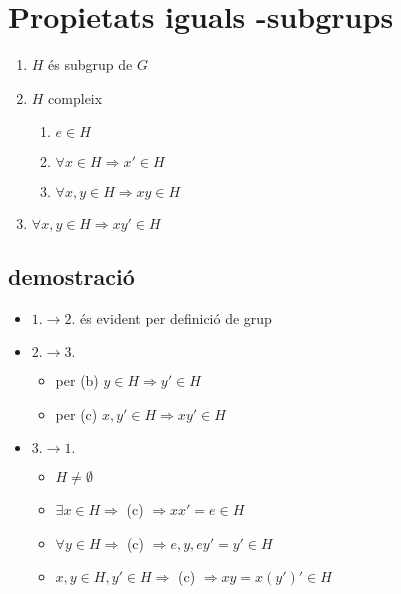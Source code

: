 \documentclass{article}
\begin{document}
\section{Propietats iguals -subgrups}
\begin{enumerate}
\item $H$ és subgrup de $G$
\item $H$ compleix
	\begin{enumerate}
	\item $e \in H$
	\item $\forall x \in H \Rightarrow x' \in H$
	\item $\forall x, y \in H \Rightarrow xy \in H$
	\end{enumerate}
\item $\forall x, y \in H \Rightarrow xy' \in H$
\end{enumerate}
\subsection{demostració}
\begin{itemize}
\item $1. \to 2.$ és evident per definició de grup
\item $2. \to 3.$
	\begin{itemize}
	\item per (b) $y \in H \Rightarrow y' \in H$
	\item per (c) $x, y' \in H \Rightarrow xy' \in H$
	\end{itemize}
\item $3. \to 1.$
	\begin{itemize}
	\item $H \neq \emptyset$
	\item $\exists x \in H \Rightarrow$ (c) $\Rightarrow xx' = e \in H$
	\item $\forall y \in H \Rightarrow$ (c) $\Rightarrow e, y, ey' = y' \in H$
	\item $x, y \in H, y' \in H \Rightarrow$ (c) $\Rightarrow xy = x(y')' \in H$
	\end{itemize}
\end{itemize}


\end{document}
